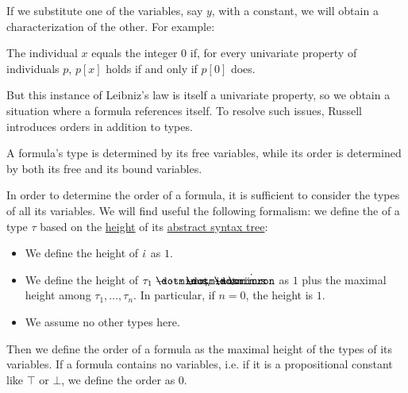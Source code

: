 \begin{concept}
\begin{thmenum}
    If we substitute one of the variables, say \( y \), with a constant, we will obtain a characterization of the other. For example:
    \begin{displayquote}
      The individual \( x \) equals the integer \( 0 \) if, for every univariate property of individuals \( p \), \( p[x] \) holds if and only if \( p[0] \) does.
    \end{displayquote}

    But this instance of Leibniz's law is itself a univariate property, so we obtain a situation where a formula references itself. To resolve such issues, Russell introduces orders in addition to types.

     A formula's type is determined by its free variables, while its order is determined by both its free and its bound variables.

    In order to determine the order of a formula, it is sufficient to consider the types of all its variables. We will find useful the following formalism: we define the  of a type \( \tau \) based on the \hyperref[def:rooted_tree/height]{height} of its \hyperref[def:simple_type_ast]{abstract syntax tree}:
    \begin{itemize}
      \item We define the height of \( \dot{\iota} \) as \( 1 \).
      \item We define the height of \( \tau_1 \synimplies \cdots \synimplies \tau_n \synimplies \syn\omicron \) as \( 1 \) plus the maximal height among \( \tau_1, \ldots, \tau_n \). In particular, if \( n = 0 \), the height is \( 1 \).
      \item We assume no other types here.
    \end{itemize}

    Then we define the order of a formula as the maximal height of the types of its variables. If a formula contains no variables, i.e. if it is a propositional constant like \( \top \) or \( \bot \), we define the order as \( 0 \).


\end{thmenum}
\end{concept}
